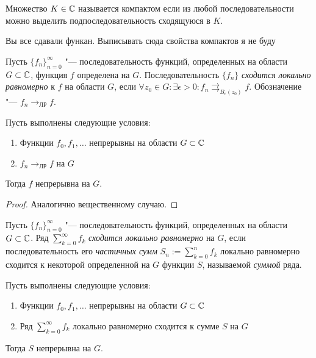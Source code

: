 \begin{definition}
    Множество $K \in \mathbb{C}$ называется компактом если из любой последовательности можно выделить подпоследовательность сходящуюся в $K$.
\end{definition}
\begin{unnecessary}
    \begin{note}
        Вы все сдавали функан. Выписывать сюда свойства компактов я не буду
    \end{note}
\end{unnecessary}
\begin{definition}
	Пусть $\{f_n\}_{n = 0}^\infty$ "--- последовательность функций, определенных на области $G \subset \mathbb{C}$, функция $f$ определена на $G$. Последовательность $\{f_n\}$ \textit{сходится локально равномерно} к $f$ на области $G$, если $\forall z_0 \in G: \exists \epsilon > 0: f_n \rightrightarrows_{B_\epsilon(z_0)} f$. Обозначение "--- $f_n \rightarrow_{\text{ЛР}} f$.
\end{definition}

\begin{proposition}
	Пусть выполнены следующие условия:
	\begin{enumerate}
		\item Функции $f_0, f_1, \dotsc$ непрерывны на области $G \subset \mathbb{C}$
		\item $f_n \rightarrow_{\text{ЛР}} f$ на $G$
	\end{enumerate}
	
	Тогда $f$ непрерывна на $G$.
\end{proposition}

\begin{proof}
	Аналогично вещественному случаю.
\end{proof}

\begin{definition}
	Пусть $\{f_n\}_{n = 0}^\infty$ "--- последовательность функций, определенных на области $G \subset \mathbb{C}$. Ряд $\sum_{k = 0}^\infty f_k$ \textit{сходится локально равномерно} на $G$, если последовательность его \textit{частичных сумм} $S_n := \sum_{k = 0}^nf_k$ локально равномерно сходится к некоторой определенной на $G$ функции $S$, называемой \textit{суммой} ряда.
\end{definition}

\begin{proposition}
	Пусть выполнены следующие условия:
	\begin{enumerate}
		\item Функции $f_0, f_1, \dotsc$ непрерывны на области $G \subset \mathbb{C}$
		\item Ряд $\sum_{k = 0}^\infty f_k$ локально равномерно сходится к сумме $S$ на $G$
	\end{enumerate}
	
	Тогда $S$ непрерывна на $G$.
\end{proposition}

